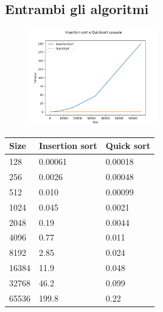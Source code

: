 \documentclass[]{article}
\begin{document}
\subsection{Entrambi gli algoritmi}
\begin{figure}[H]
\centering
	\includegraphics[width=0.5\textwidth]{InsertionSortEQuicksortCasuale}
	\label{fig:insertion_quick}
\end{figure}

\begin{table}[H]
\label{tab:insertion_quick}
\centering
\begin{tabular}{|l|l|l|} 
\hline
Size  & Insertion sort & Quick sort  \\ 
\hline
128   & 0.00061        & 0.00018     \\
256   & 0.0026         & 0.00048     \\
512   & 0.010          & 0.00099     \\
1024  & 0.045          & 0.0021      \\
2048  & 0.19           & 0.0044      \\
4096  & 0.77           & 0.011       \\
8192  & 2.85           & 0.024       \\
16384 & 11.9           & 0.048       \\
32768 & 46.2           & 0.099       \\
65536 & 199.8          & 0.22        \\
\hline
\end{tabular}
\end{table}
\end{document}
